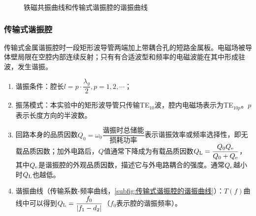 	\begin{figure}[htbp]
		\hspace{1cm}
		\caption{铁磁共振曲线和传输式谐振腔的谐振曲线}
	\end{figure}
	\subsubsection{传输式谐振腔} %
		\label{ssub:传输式谐振腔}
		\par 传输式金属谐振腔时一段矩形波导管两端加上带耦合孔的短路金属板。电磁场被导体壁局限在空腔内部连续反射；只有有合适波型和频率的电磁波能在其中形成驻波，发生谐振。
		\begin{enumerate}
			\item 谐振条件：腔长$l=p\cdot\dfrac{\lambda_g}{2},p=1,2,\cdots$；
			\item 振荡模式：本实验中的矩形波导管只传输TE$_{10}$波，腔内电磁场表示为TE$_{10p}$。$p$表示长度方向的半波数。
			\item 回路本身的品质因数$Q_0 = \omega_0\dfrac{\text{谐振时总储能}}{\text{损耗功率}}$表示谐振效率或频率选择性，即无载品质因数；加外电路后，$Q$值通常下降成为有载品质因数$Q_{\rm L}=\dfrac{Q_{0}Q_{\rm e}}{Q_{0}+Q_{\rm e}}$，其中$Q_{\rm e}$是谐振腔的外观品质因数，描述它与外电路耦合的强度。通常$Q_{\rm e}$越小时$Q_{\rm L}$也越低。
			\item 谐振曲线（传输系数-频率曲线，\cref{subfig:传输式谐振腔的谐振曲线}）：$T(f)$曲线中可以得到$Q_{\rm L}=\dfrac{f_0}{|f_1-d_2|}$（$f_0$表示腔的谐振频率）。
		\end{enumerate}
